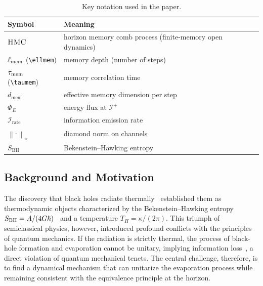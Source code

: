 \documentclass[a4paper,11pt]{article}
\newcommand{\Irate}{\mathcal{I}_{\mathrm{rate}}}
\newcommand{\Eflux}{\Phi_E}
\newcommand{\Ddiamond}[1]{\left\|#1\right\|_\diamond}
\newcommand{\HMC}{\textup{\textsc{HMC}}\xspace}
\let\mathscr\mathcal
\newcommand{\dmem}{\ensuremath{d_{\mathrm{mem}}}}
\newcommand{\SBH}{\ensuremath{S_{\mathrm{BH}}}}
\theoremstyle{plain}
\theoremstyle{definition}
\theoremstyle{remark}
\begin{document}
\begin{table}[t]
  \centering
  \caption{Key notation used in the paper.}
  \label{tab:notation}
  \begin{tabular}{ll}
    \toprule
    Symbol & Meaning \\
    \midrule
    $\HMC{}$ & horizon memory comb process (finite-memory open dynamics) \\
    $\ell_{\rm mem}$ (\texttt{\textbackslash ellmem}) & memory depth (number of steps) \\
    $\tau_{\rm mem}$ (\texttt{\textbackslash taumem}) & memory correlation time \\
    $\dmem$ & effective memory dimension per step \\
    $\Eflux$ & energy flux at $\mathscr{I}^+$ \\
    $\Irate$ & information emission rate \\
    $\Ddiamond{\cdot}$ & diamond norm on channels \\
    $\SBH$ & Bekenstein--Hawking entropy \\
    \bottomrule
  \end{tabular}
\end{table}

\subsection{Background and Motivation}
The discovery that black holes radiate thermally~\cite{Hawking:1975} established them as thermodynamic objects characterized by the Bekenstein--Hawking entropy $S_{\rm BH} = A/(4G\hbar)$~\cite{Bekenstein:1973} and a temperature $T_H = \kappa/(2\pi)$. This triumph of semiclassical physics, however, introduced profound conflicts with the principles of quantum mechanics. If the radiation is strictly thermal, the process of black\nobreakdash-hole formation and evaporation cannot be unitary, implying information loss~\cite{Hawking:1976}, a direct violation of quantum mechanical tenets. The central challenge, therefore, is to find a dynamical mechanism that can unitarize the evaporation process while remaining consistent with the equivalence principle at the horizon.
\end{document}
